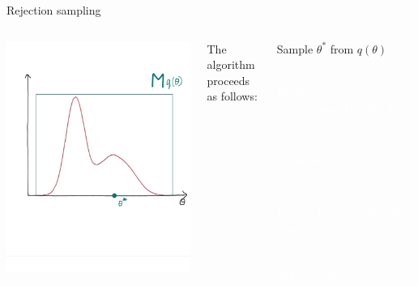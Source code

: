 \documentclass[compress]{beamer}
\begin{document}
\begin{frame}[label=sec-5-4]{Rejection sampling}
    \begin{columns}[c] 
    \includegraphics[width=1\linewidth]{RS3}

    The algorithm proceeds as follows:\\
    \begin{enumerate}
        \item Sample $\theta^*$ from $q(\theta)$ \\~\\
        \textcolor{white}{
            \item[\color{white}] Draw $u \sim Uniform[0, Mq(\theta^*)]$ \\~\\
            \item[\color{white}] Evaluate $f(\theta^*)$ \\~\\
            \item[\color{white}] If $f(\theta^*) > u$ accept, else reject \\~\\
            \item[\color{white}] Repeat steps 1-4
        }
    \end{enumerate}
\end{columns}
\end{frame}
\end{document}
